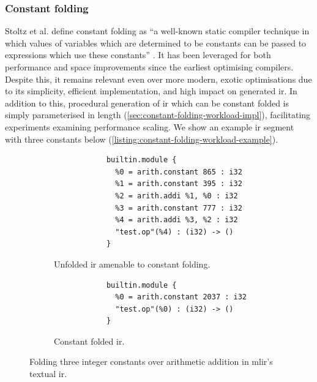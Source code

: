 \subsubsection{Constant folding}
\label{sssec:experimental-workload-constant-folding}

Stoltz et al. define constant folding as ``a well-known static compiler technique in which values of variables which are determined to be constants can be passed to expressions which use these constants'' \cite{stoltzConstantPropagationFresh1994}.
It has been leveraged for both performance and space improvements since the earliest optimising compilers. Despite this, it remains relevant even over more modern, exotic optimisations due to its simplicity, efficient implementation, and high impact on generated \ac{ir}.
In addition to this, procedural generation of \ac{ir} which can be constant folded is simply parameterised in length (\autoref{sec:constant-folding-workload-impl}), facilitating experiments examining performance scaling.
We show an example \ac{ir} segment with three constants below (\autoref{listing:constant-folding-workload-example}).


\begin{figure}[H]
    \centering
    \begin{subfigure}[b]{0.45\textwidth}
       \centering
        \begin{verbatim}
            builtin.module {
              %0 = arith.constant 865 : i32
              %1 = arith.constant 395 : i32
              %2 = arith.addi %1, %0 : i32
              %3 = arith.constant 777 : i32
              %4 = arith.addi %3, %2 : i32
              "test.op"(%4) : (i32) -> ()
            }
        \end{verbatim}
        \label{listing:constant-folding-workload-initial}
        \caption{Unfolded \ac{ir} amenable to constant folding.}
    \end{subfigure}
    \hfill
    \begin{subfigure}[b]{0.45\textwidth}
        \centering
        \begin{verbatim}
            builtin.module {
              %0 = arith.constant 2037 : i32
              "test.op"(%0) : (i32) -> ()
            }
        \end{verbatim}
        \footnotesize\vspace{2.5em}
        \caption{Constant folded \ac{ir}.}
        \label{listing:constant-folding-workload-folded}
    \end{subfigure}
    \vspace{1em}
    \captionsetup{name=Listing}
    \caption{Folding three integer constants over arithmetic addition in \ac{mlir}'s textual \ac{ir}.}
    \label{listing:constant-folding-workload-example}
\end{figure}

